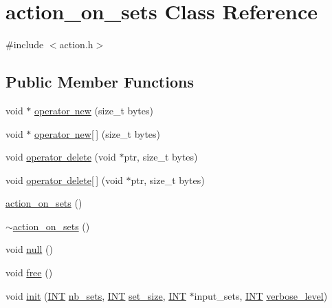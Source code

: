\hypertarget{classaction__on__sets}{}\section{action\+\_\+on\+\_\+sets Class Reference}
\label{classaction__on__sets}


{\ttfamily \#include $<$action.\+h$>$}

\subsection*{Public Member Functions}
\begin{DoxyCompactItemize}
\item 
void $\ast$ \mbox{\hyperlink{classaction__on__sets_aaeeed6cd20cba2bbdeac517c7d036fb0}{operator new}} (size\+\_\+t bytes)
\item 
void $\ast$ \mbox{\hyperlink{classaction__on__sets_a090b20780d6b2a587682f22e61ece106}{operator new\mbox{[}$\,$\mbox{]}}} (size\+\_\+t bytes)
\item 
void \mbox{\hyperlink{classaction__on__sets_a0201fc0ab8b7968f3839e7a989119b2b}{operator delete}} (void $\ast$ptr, size\+\_\+t bytes)
\item 
void \mbox{\hyperlink{classaction__on__sets_a1faaa817a4d5de3d3531da9aaa1f6aab}{operator delete\mbox{[}$\,$\mbox{]}}} (void $\ast$ptr, size\+\_\+t bytes)
\item 
\mbox{\hyperlink{classaction__on__sets_ad3bce26f258c0c11a287a4fb8c4999a1}{action\+\_\+on\+\_\+sets}} ()
\item 
\mbox{\hyperlink{classaction__on__sets_adeff08f206ceeedd266e25eccfe9152c}{$\sim$action\+\_\+on\+\_\+sets}} ()
\item 
void \mbox{\hyperlink{classaction__on__sets_a6569141597e96749c1b58c4c3798e9df}{null}} ()
\item 
void \mbox{\hyperlink{classaction__on__sets_ab92161d21c1b55331f46c72a9cb7d575}{free}} ()
\item 
void \mbox{\hyperlink{classaction__on__sets_a1075f47e9a27352a596cff7f5f599f2f}{init}} (\mbox{\hyperlink{galois_8h_a09fddde158a3a20bd2dcadb609de11dc}{I\+NT}} \mbox{\hyperlink{classaction__on__sets_aa9fa82b5197bdc7ed7ee442928eb433c}{nb\+\_\+sets}}, \mbox{\hyperlink{galois_8h_a09fddde158a3a20bd2dcadb609de11dc}{I\+NT}} \mbox{\hyperlink{classaction__on__sets_abfc32ee43a067df299af027da0fdd0be}{set\+\_\+size}}, \mbox{\hyperlink{galois_8h_a09fddde158a3a20bd2dcadb609de11dc}{I\+NT}} $\ast$input\+\_\+sets, \mbox{\hyperlink{galois_8h_a09fddde158a3a20bd2dcadb609de11dc}{I\+NT}} \mbox{\hyperlink{simeon_8_c_a818073fbcc2f439e7c56952f67386122}{verbose\+\_\+level}})

\end{DoxyCompactItemize}
